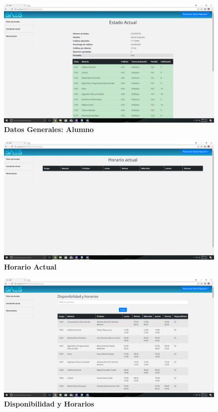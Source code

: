\begin{figure}[H]
  \centering
    \includegraphics[scale=0.2]{project/images/3.png}
  \caption{\textbf{Datos Generales: Alumno}}
\end{figure}
\begin{figure}[H]
  \centering
    \includegraphics[scale=0.2]{project/images/4.png}
  \caption{\textbf{Horario Actual}}
\end{figure}
\begin{figure}[H]
  \centering
    \includegraphics[scale=0.2]{project/images/5.png}
  \caption{\textbf{Disponibilidad y Horarios}}
\end{figure}
